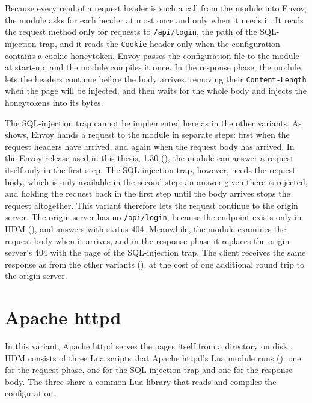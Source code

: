 \documentclass{rptuma}
\begin{document}
Because every read of a request header is such a call from the module into Envoy, the module asks
for each header at most once and only when it needs it. It reads the request method only for
requests to \texttt{/api/login}, the path of the SQL-injection trap, and it reads the
\texttt{Cookie} header only when the configuration contains a cookie honeytoken. Envoy passes the
configuration file to the module at start-up, and the module compiles it once. In the response
phase, the module lets the headers continue before the body arrives, removing their
\texttt{Content-Length} when the page will
be injected, and then waits for the whole body and injects the honeytokens into its bytes.

The SQL-injection trap cannot be implemented here as in the other variants. As  shows, Envoy
hands a request to the module in separate steps: first when the request headers have arrived, and again when the
request body has arrived. In the Envoy release used in this thesis, 1.30
(), the module can answer a request itself only in the first step.
The SQL-injection trap, however, needs the request body, which is only available in the second
step: an answer given there is rejected, and holding the request back in the first step until the
body arrives stops the request altogether. This variant therefore lets the
request continue to the origin server. The origin server has no \texttt{/api/login}, because the
endpoint exists only in HDM (), and answers with status 404. Meanwhile,
the module examines the request body when it arrives, and in the response phase it replaces the
origin server's 404 with the page of the SQL-injection trap. The client receives the same response as from the other variants
(), at the cost of one additional round trip to the origin server.

\section{Apache httpd}
\label{sec:impl.apache}

In this variant, Apache httpd serves the pages itself from a directory on disk \cite{apache_request}. HDM consists of three Lua scripts that Apache httpd's Lua module runs
(): one for the request phase, one for the SQL-injection trap and one
for the response body. The three share a common Lua library that reads and compiles the
configuration.
\end{document}
